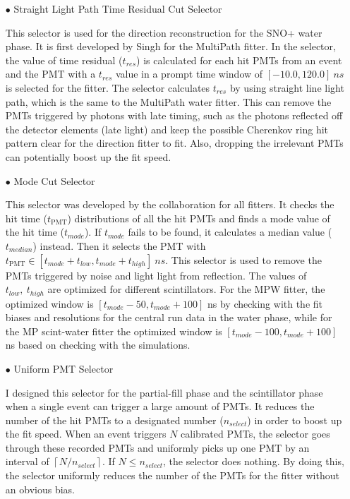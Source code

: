 \begin{itemize}
	\item[$\bullet$] Straight Light Path Time Residual Cut Selector
	
	This selector is used for the direction reconstruction for the SNO+ water phase. It is first developed by Singh for the MultiPath fitter. In the selector, the value of time residual ($t_{res}$) is calculated for each hit PMTs from an event and the PMT with a $t_{res}$ value in a prompt time window of $[-10.0, 120.0]~ns$ is selected for the fitter. The selector calculates $t_{res}$ by using straight line light path, which is the same to the MultiPath water fitter. This can remove the PMTs triggered by photons with late timing, such as the photons reflected off the detector elements (late light) and keep the possible Cherenkov ring hit pattern clear for the direction fitter to fit. Also, dropping the irrelevant PMTs can potentially boost up the fit speed.
	
	\item[$\bullet$] Mode Cut Selector
	
	This selector was developed by the collaboration for all fitters. It checks the hit time ($t_\mathrm{PMT}$) distributions of all the hit PMTs and finds a mode value of the hit time ($t_{mode}$). If $t_{mode}$ fails to be found, it calculates a median value ($t_{median}$) instead\cite{modeCut}. Then it selects the PMT with $t_\mathrm{PMT} \in [t_{mode}+t_{low}, t_{mode}+t_{high}]~ns$. This selector is used to remove the　PMTs triggered by noise and light light from reflection. The values of $t_{low},~t_{high}$ are optimized for different scintillators. For the MPW fitter, the optimized window is $[t_{mode}-50, t_{mode}+100]$ ns by checking with the fit biases and resolutions for the  central run data in the water phase, while for the MP scint-water fitter the optimized window is $[t_{mode}-100, t_{mode}+100]$ ns based on checking with the simulations.
	
	\item[$\bullet$] Uniform PMT Selector
	
	I designed this selector for the partial-fill phase and the scintillator phase when a single event can trigger a large amount of PMTs. It reduces the number of the hit PMTs to a designated number ($n_{select}$) in order to boost up the fit speed. When an event triggers $N$ calibrated PMTs, the selector goes through these recorded PMTs and uniformly picks up one PMT by an interval of $\left \lceil{N/n_{select}}\right \rceil $. If $N\leq n_{select}$, the selector does nothing. By doing this, the selector uniformly reduces the number of the PMTs for the fitter without an obvious bias.
	

\end{itemize}
